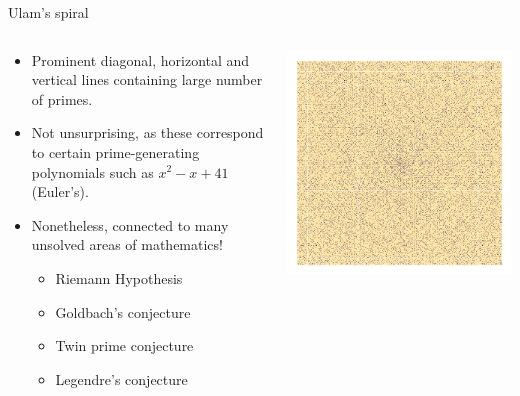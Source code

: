 \documentclass[,aspectratio=169]{beamer}
\providecommand{\tightlist}{%
  \setlength{\itemsep}{0pt}\setlength{\parskip}{0pt}}
\begin{document}
\begin{frame}{Ulam's spiral}
\protect\hypertarget{ulams-spiral}{}
\begin{columns}[T]
\begin{column}{0.4\textwidth}
\begin{itemize}
\item
  Prominent diagonal, horizontal and vertical lines containing large
  number of primes.
\item
  Not unsurprising, as these correspond to certain prime-generating
  polynomials such as \(x^2 - x + 41\) (Euler's).
\item
  Nonetheless, connected to many unsolved areas of mathematics!

  \begin{itemize}
  \tightlist
  \item
    Riemann Hypothesis
  \item
    Goldbach's conjecture
  \item
    Twin prime conjecture
  \item
    Legendre's conjecture
  \end{itemize}
\end{itemize}
\end{column}

\begin{column}{0.6\textwidth}
\vspace{-3em}

\begin{center}\includegraphics[width=0.9\linewidth]{figure/unnamed-chunk-3-1} \end{center}
\end{column}
\end{columns}
\end{frame}
\end{document}
